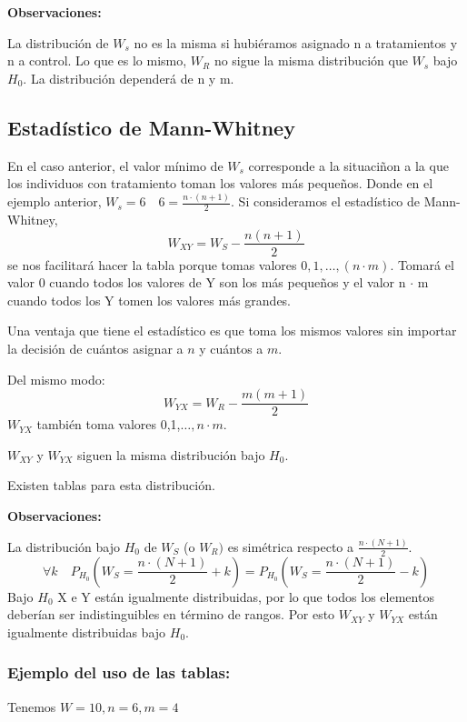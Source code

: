 \vspace{2mm}

\noindent \textbf{Observaciones:}

La distribución de $W_s$ no es la misma si hubiéramos asignado n a tratamientos y n a control. Lo que es lo mismo, $W_R$ no sigue la misma distribución que $W_s$ bajo $H_0$. La distribución dependerá de n y m.

\subsection{Estadístico de Mann-Whitney}

En el caso anterior, el valor mínimo de $W_s$ corresponde a la situaciñon a la que los individuos con tratamiento toman los valores más pequeños. Donde en el ejemplo anterior, $W_s=6 \quad 6=\frac{n \cdot (n+1)}{2}$.
Si consideramos el estadístico de Mann-Whitney,
\[
    W_{XY}=W_S-\frac{n(n+1)}{2}
\]
se nos facilitará hacer la tabla porque tomas valores $0,1,\dots,(n \cdot m)$. Tomará el valor 0 cuando todos los valores de Y son los más pequeños y el valor n $\cdot$ m  cuando todos los Y tomen los valores más grandes.

Una ventaja que tiene el estadístico es que toma los mismos valores sin importar la decisión de cuántos asignar a $n$ y cuántos a $m$.

Del mismo modo:
\[
    W_{YX}=W_R-\frac{m(m+1)}{2}
\]
$W_{YX}$ también toma valores 0,1,$\dots,n \cdot m$.

\noindent $W_{XY}$ y $W_{YX}$ siguen la misma distribución bajo $H_0$.

\newpage

\noindent Existen tablas para esta distribución.

\vspace{2mm}

\noindent \textbf{Observaciones:}

La distribución bajo $H_0$ de $W_S$ (o $W_R)$ es simétrica respecto a $\frac{n \cdot (N+1)}{2}$.
\[
    \forall k \quad P_{H_0} \left( W_S=\frac{n \cdot (N+1)}{2}+k\right)=
    P_{H_0} \left( W_S=\frac{n \cdot (N+1)}{2}-k\right)
\]
Bajo $H_0$ X e Y están igualmente distribuidas, por lo que todos los elementos deberían ser indistinguibles en término de rangos. Por esto $W_{XY}$ y $W_{YX}$ están igualmente distribuidas bajo $H_0$.

\subsubsection*{Ejemplo del uso de las tablas:}
\noindent Tenemos $W=10,n=6,m=4$

